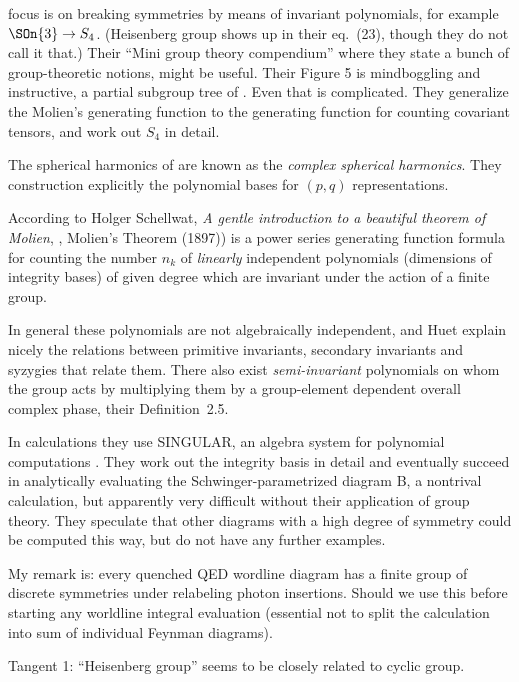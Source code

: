 \begin{description}

 focus is on breaking symmetries by means of invariant
polynomials, for example $\SOn{3} \to S_4$. (Heisenberg group shows up in their
eq.~(23), though they do not call it that.) Their ``Mini group theory
compendium'' where they state  a bunch of group-theoretic notions, might be
useful. Their Figure 5 is mindboggling and instructive, a partial subgroup  tree
of . Even that is complicated.
They generalize the Molien's generating function  to the
generating  function  for  counting  covariant tensors, and work out $S_4$ in
detail.

The  spherical  harmonics of  are known as the \emph{complex  spherical
harmonics}.
They construction explicitly the polynomial bases for $(p,q)$ representations.

According to Holger Schellwat,
{\em A gentle introduction to a beautiful theorem of {Molien}},
,
Molien's Theorem (1897)) is a power series generating function formula for
counting the number $n_k$ of \emph{linearly} independent polynomials (dimensions of
integrity bases) of given degree which are invariant under the action of a finite
group.

In general these polynomials are not algebraically independent,
and Huet \etal{} explain nicely the relations between primitive invariants,
secondary invariants and syzygies that relate them. There also exist
\emph{semi-invariant} polynomials on whom the group acts by multiplying them by
a group-element dependent overall complex phase, their Definition~2.5.

In calculations they use SINGULAR, an algebra system for polynomial
computations . They work out the  integrity basis in
detail and eventually succeed in analytically evaluating the
Schwinger-parametrized  diagram B, a nontrival calculation, but apparently very
difficult without their application of group theory. They speculate that other
diagrams with a high degree of symmetry could be computed this way, but do not
have any further examples.

My remark is: every quenched QED wordline diagram has a finite group of discrete
symmetries under relabeling photon insertions. Should we use this before starting
any worldline integral evaluation (essential not to split the calculation into
sum of individual Feynman diagrams).

Tangent 1: ``Heisenberg group'' seems to be closely related to cyclic group.


\end{description}
